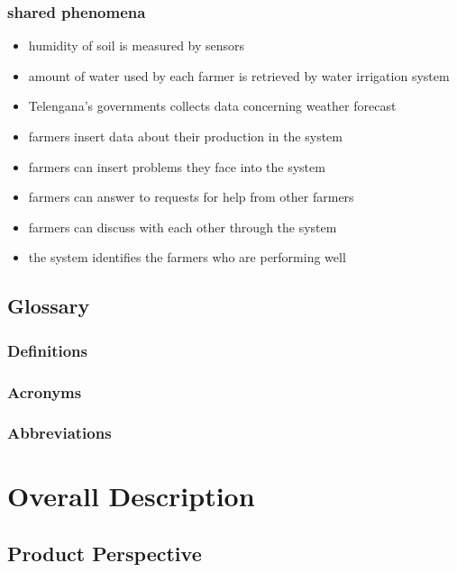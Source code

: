 \documentclass{article}
\begin{document}
\subsubsection{shared phenomena}

\begin{itemize}
    \item humidity of soil is measured by sensors 
    \item amount of water used by each farmer is retrieved by water irrigation system
    \item Telengana's governments collects data concerning weather forecast
    \item farmers insert data about their production in the system
    \item farmers can insert problems they face into the system
    \item farmers can answer to requests for help from other farmers
    \item farmers can discuss with each other through the system
    \item the system identifies the farmers who are performing well
\end{itemize}

\subsection{Glossary}
\subsubsection{Definitions}
\subsubsection{Acronyms}
\subsubsection{Abbreviations}






\section{Overall Description}
\subsection{Product Perspective}
\end{document}
